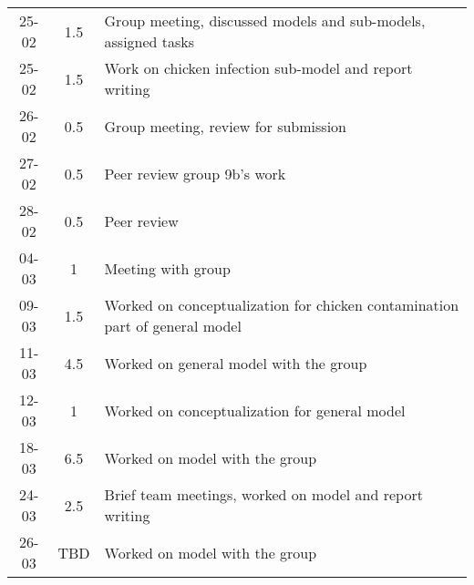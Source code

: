 \begin{longtable}[c]{c|c|m{35em}}
25-02   &   1.5     &   Group meeting, discussed models and sub-models, assigned tasks              \\
25-02   &   1.5     &   Work on chicken infection sub-model and report writing                      \\
26-02   &   0.5     &   Group meeting, review for submission                                        \\
27-02   &   0.5     &   Peer review group 9b's work                                                 \\
28-02   &   0.5     &   Peer review                                                                 \\
04-03   &   1       &   Meeting with group                                                          \\
09-03   &   1.5     &   Worked on conceptualization for chicken contamination part of general model \\
11-03   &   4.5     &   Worked on general model with the group                                      \\
12-03   &   1       &   Worked on conceptualization for general model                               \\
18-03   &   6.5     &   Worked on model with the group                                              \\
24-03   &   2.5     &   Brief team meetings, worked on model and report writing                    \\
26-03   &   TBD     &   Worked on model with the group                                              \\



\end{longtable}

